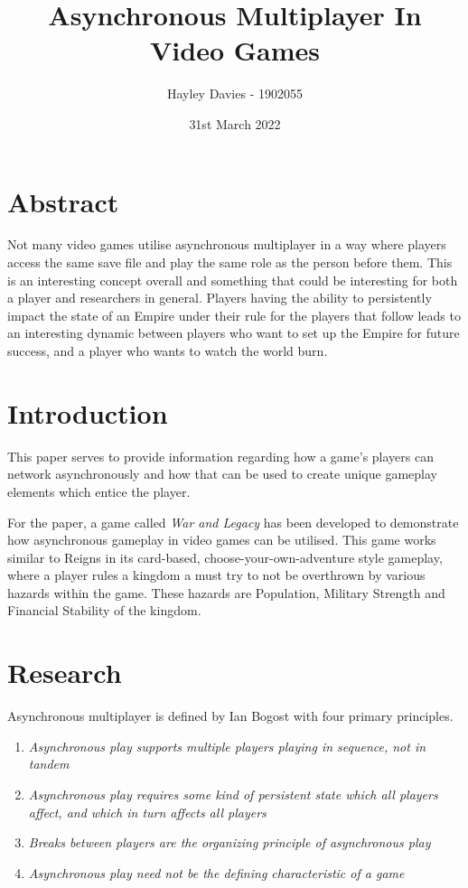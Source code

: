 \documentclass{article}
\title{Asynchronous Multiplayer In Video Games}
\author{Hayley Davies - 1902055}
\date{31st March 2022}
\begin{document}
\maketitle

\section{Abstract}
Not many video games utilise asynchronous multiplayer in a way where players access the same save file and play the same role as the person before them. This is an interesting concept overall and something that could be interesting for both a player and researchers in general. Players having the ability to persistently impact the state of an Empire under their rule for the players that follow leads to an interesting dynamic between players who want to set up the Empire for future success, and a player who wants to watch the world burn.

\section{Introduction}
This paper serves to provide information regarding how a game's players can network asynchronously and how that can be used to create unique gameplay elements which entice the player.

For the paper, a game called \emph{War and Legacy} has been developed to demonstrate how asynchronous gameplay in video games can be utilised. This game works similar to Reigns\cite{reigns2016} in its card-based, choose-your-own-adventure style gameplay, where a player rules a kingdom a must try to not be overthrown by various hazards within the game. These hazards are Population, Military Strength and Financial Stability of the kingdom.

\section{Research}
Asynchronous multiplayer is defined by Ian Bogost\cite{bogost2004} with four primary principles.
\begin{enumerate}
    \item \emph{Asynchronous play supports multiple players playing in sequence, not in tandem}
    \item \emph{Asynchronous play requires some kind of persistent state which all players affect, and which in turn affects all players}
    \item \emph{Breaks between players are the organizing principle of asynchronous play}
    \item \emph{Asynchronous play need not be the defining characteristic of a game}
\end{enumerate}
\end{document}
